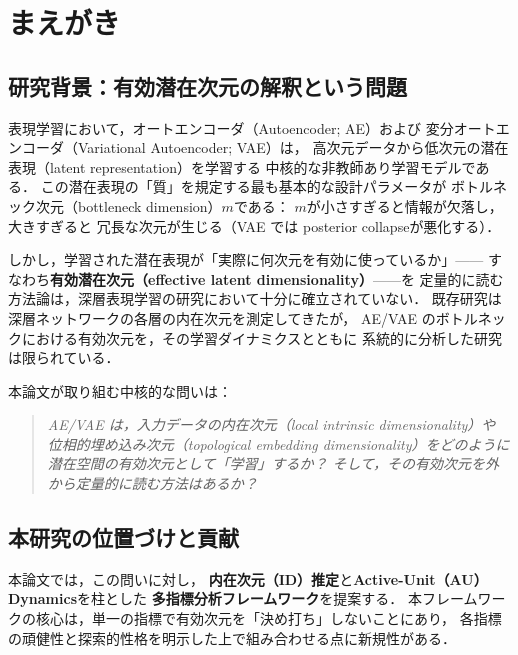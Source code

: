 \documentclass[11pt,a4paper]{jsarticle}
\begin{document}
\section{まえがき}\label{sec:intro}

\subsection{研究背景：有効潜在次元の解釈という問題}\label{sec:intro_bg}

表現学習において，オートエンコーダ（Autoencoder; AE）および
変分オートエンコーダ（Variational Autoencoder; VAE）\cite{kingma2014vae}は，
高次元データから低次元の潜在表現（latent representation）を学習する
中核的な非教師あり学習モデルである\cite{bengio2013representation}．
この潜在表現の「質」を規定する最も基本的な設計パラメータが
ボトルネック次元（bottleneck dimension）$m$である：
$m$が小さすぎると情報が欠落し，大きすぎると
冗長な次元が生じる（VAE では posterior collapse\cite{lucas2019elbo}が悪化する）．

しかし，学習された潜在表現が「実際に何次元を有効に使っているか」——
すなわち\textbf{有効潜在次元（effective latent dimensionality）}——を
定量的に読む方法論は，深層表現学習の研究において十分に確立されていない．
既存研究\cite{ansuini2019intrinsic,valeriani2023geometry}は
深層ネットワークの各層の内在次元を測定してきたが，
AE/VAE のボトルネックにおける有効次元を，その学習ダイナミクスとともに
系統的に分析した研究は限られている．

本論文が取り組む中核的な問いは：
\begin{quote}
\textit{AE/VAE は，入力データの内在次元（local intrinsic dimensionality）や
位相的埋め込み次元（topological embedding dimensionality）をどのように
潜在空間の有効次元として「学習」するか？
そして，その有効次元を外から定量的に読む方法はあるか？}
\end{quote}

\subsection{本研究の位置づけと貢献}\label{sec:intro_aim}

本論文では，この問いに対し，
\textbf{内在次元（ID）推定}と\textbf{Active-Unit（AU）Dynamics}を柱とした
\textbf{多指標分析フレームワーク}を提案する．
本フレームワークの核心は，単一の指標で有効次元を「決め打ち」しないことにあり，
各指標の頑健性と探索的性格を明示した上で組み合わせる点に新規性がある．
\end{document}
